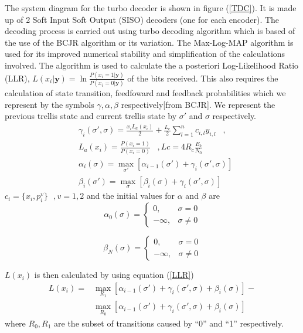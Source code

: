 \documentclass[a4paper, 12pt, oneside, openary]{jbook}
\begin{document}
 
 The system diagram for the turbo decoder is shown in figure (\ref{TDC}). It is made up of 2
 Soft Input Soft Output (SISO) decoders (one for each encoder). The decoding 
 process is carried out using turbo decoding algorithm which is based of the use of
 the BCJR algorithm or its variation.  The Max-Log-MAP algorithm is used 
 for its improved numerical stability and simplification of the calculations involved. 
 The algorithm is used to calculate the a posteriori Log-Likelihood Ratio (LLR),  
 $L(x_i|\mathbf{y})=\ln \frac{P(x_i=1|\mathbf{y})}{P(x_i=0|\mathbf{y})}$ 
 of the bits received. This also requires
 the calculation of state transition, feedfoward and feedback probabilities which we
 represent by the symbols $\gamma,\alpha, \beta $ respectively[from BCJR]. We 
 represent the previous trellis state and current trellis state by $\sigma'$ and $\sigma$ 
 respectively.
\begin{equation}
\begin{split}
&\gamma_i(\sigma',\sigma)=
\frac{x_i L_a (x_i)}{2}+
\frac{L_c}{2}\sum_{l=1}^{n} c_{i,l}y_{i,l}\,\,\,\,\, ,\\&L_a(x_i) =\frac{P(x_i=1)}{P(x_i=0)}
\,\,\,\,\, ,Lc=4R_c\frac{E_b}{N_0}\\
&\alpha_i(\sigma)=\max_{\sigma'}[\alpha_{i-1}(\sigma')+\gamma_i(\sigma',\sigma)]\\
&\beta_i(\sigma')=\max_{\sigma}[\beta_{i}(\sigma)+\gamma_i(\sigma',\sigma)]
\end{split}
\label{abc}
\end{equation}
$c_i=\{x_i,p^{v}_i\}\,\,\,\, ,v=1,2$ and the initial values for $\alpha$ and $\beta$ are
\[
    \alpha_0(\sigma)= 
\begin{cases}
   0,& \sigma= 0\\        -\infty,              &  \sigma \neq 0
\end{cases}
\]

\[
   \beta_N(\sigma)= 
\begin{cases}
   0,& \sigma= 0\\        -\infty,              &  \sigma \neq 0
\end{cases}
\]

$ L(x_i)$ is then calculated by using equation (\ref{LLR})
 \begin{equation}
 \begin{split}
 L(x_i)=&\max_{R_1}[\alpha_{i-1}(\sigma')+ \gamma_i(\sigma',\sigma)+\beta_i(\sigma)]
 -\\
 &\max_{R_0}[\alpha_{i-1}(\sigma')+ \gamma_i(\sigma',\sigma)+\beta_i(\sigma)]
\label{LLR}
\end{split}
\end{equation}
where $R_0,R_1$ are the subset of transitions caused by ``0'' and ``1'' respectively.
\end{document}
